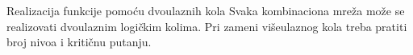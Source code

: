 \begin{frame}[label=02-s028]{Realizacija funkcije pomoću dvoulaznih kola}
Svaka kombinaciona mreža može se realizovati dvoulaznim logičkim kolima. Pri zameni višeulaznog kola treba pratiti broj nivoa i kritičnu putanju.
\par\vspace{1mm}
\centering\par
\begingroup
\def\DEvrsta{and}\def\DEodnos{=}\def\DEkriticna{0}
\par
\def\DEvrsta{or}\def\DEkriticna{1}

\endgroup
\end{frame}
